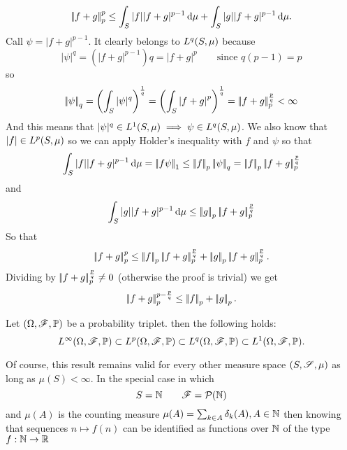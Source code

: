 \documentclass{article}
\begin{document}
\begin{fancyproof}
	\begin{equation*}
			\left|\negthinspace\left|f+g\right|\negthinspace\right|_{p}^{p}\leq \int_S|f||f+g|^{p-1}\mathop{}\!\mathrm{d}\mu+\int_S|g||f+g|^{p-1}\mathop{}\!\mathrm{d}\mu.
	\end{equation*}
	Call $\psi=|f+g|^{p-1}$. It clearly belongs to $L^{q}(S,\mu)$ because
	\begin{equation*}
		|\psi|^{q}=\left(|f+g|^{p-1}\right)q=\left|f+g\right|^{p}\qquad\text{since }q(p-1)=p
	\end{equation*}
	so
	\begin{equation*}
		\left|\negthinspace\left|\psi\right|\negthinspace\right|_{q}=\left(\int_S|\psi|^q\right)^{\frac{1}{q}}=\left(\int_S\left|f+g\right|^{p}\right)^{\frac{1}{q}}=\left|\negthinspace\left|f+g\right|\negthinspace\right|_{p}^{\frac{p}{q}}<\infty
	\end{equation*}
	And this means that $|\psi|^{q}\in L^{1}(S,\mu)\implies\psi\in L^{q}(S,\mu)$. We also know that $|f|\in L^{p}(S,\mu)$ so we can apply Holder's inequality with $f$ and $\psi$ so that
	\begin{equation*}
		\int_S|f||f+g|^{p-1}\dmu=\norm{f\psi}_1\leq\norm{f}_p\norm{\psi}_q=\norm{f}_p\norm{f+g}_p^{\frac{p}{q}}
	\end{equation*}
	and
	\begin{equation*}
		\int_S|g||f+g|^{p-1}\mathop{}\!\mathrm{d}\mu\leq\left|\negthinspace\left|g\right|\negthinspace\right|_p\left|\negthinspace\left|f+g\right|\negthinspace\right|_p^{\frac{p}{q}}
	\end{equation*}
	So that
	\begin{equation*}
		\norm{f+g}_p^p\leq\norm{f}_p\norm{f+g}_p^{\frac{p}{q}}+\norm{g}_p\norm{f+g}_p^{\frac{p}{q}}.
	\end{equation*}
	Dividing by $\left|\negthinspace\left|f+g\right|\negthinspace\right|_p^{\frac{p}{q}}\neq0$ (otherwise the proof is trivial) we get
	\begin{equation*}
		\left|\negthinspace\left|f+g\right|\negthinspace\right|_p^{p-\frac{p}{q}}\leq\left|\negthinspace\left|f\right|\negthinspace\right|_p+\left|\negthinspace\left|g\right|\negthinspace\right|_p.
	\end{equation*}
\end{fancyproof}
\begin{proposition}
	Let $(\Omega,\mathscr{F},\mathbb{P})$ be a probability triplet. then the following holds:
	\begin{equation*}
		L^{\infty}(\Omega,\mathscr{F},\mathbb{P})\subset L^{p}(\Omega,\mathscr{F},\mathbb{P})\subset L^{q}(\Omega,\mathscr{F},\mathbb{P})\subset L^{1}(\Omega,\mathscr{F},\mathbb{P}).
	\end{equation*}
\end{proposition}
Of course, this result remains valid for every other measure space $(S,\mathscr{S},\mu)$ as long as $\mu(S)<\infty$. In the special case in which 
\begin{equation*}
	S=\mathbb{N}\qquad\mathscr{F}=\mathcal{P}(\mathbb{N})
\end{equation*}
and $\mu(A)$ is the counting measure $\mu(A)=\sum_{k\in A}\delta_k(A),A\in\mathbb{N}$ then knowing that sequences $n\mapsto f(n)$ can be identified as functions over $\mathbb{N}$ of the type $f:\mathbb{N}\to\mathbb{R}$
\end{document}
